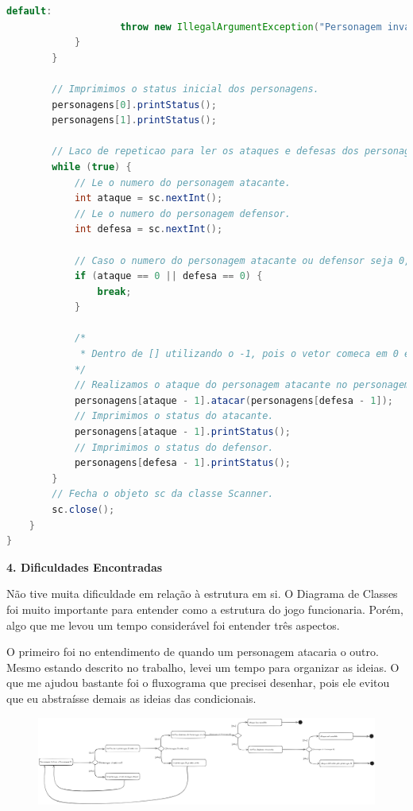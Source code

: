 \documentclass[11pt]{uiobrev}
\begin{document}
\begin{lstlisting}[language=Java, caption={Codigo Principal do Programa}]
                default:
                    throw new IllegalArgumentException("Personagem invalido.");
            }
        }

        // Imprimimos o status inicial dos personagens.
        personagens[0].printStatus();
        personagens[1].printStatus();

        // Laco de repeticao para ler os ataques e defesas dos personagens.
        while (true) {
            // Le o numero do personagem atacante.
            int ataque = sc.nextInt();
            // Le o numero do personagem defensor.
            int defesa = sc.nextInt();

            // Caso o numero do personagem atacante ou defensor seja 0, o laco e interrompido.
            if (ataque == 0 || defesa == 0) {
                break;
            }

            /*
             * Dentro de [] utilizando o -1, pois o vetor comeca em 0 e o numero do personagem comeca em 1. 
            */
            // Realizamos o ataque do personagem atacante no personagem defensor.
            personagens[ataque - 1].atacar(personagens[defesa - 1]);
            // Imprimimos o status do atacante.
            personagens[ataque - 1].printStatus();
            // Imprimimos o status do defensor.
            personagens[defesa - 1].printStatus();
        }
        // Fecha o objeto sc da classe Scanner.
        sc.close();
    }
}
\end{lstlisting}

\vspace{1.5cm}
\Large \textbf{4. Dificuldades Encontradas}

\justifying
Não tive muita dificuldade em relação à estrutura em si. O Diagrama de Classes foi muito importante para entender como a estrutura do jogo funcionaria. Porém, algo que me levou um tempo considerável foi entender três aspectos.

O primeiro foi no entendimento de quando um personagem atacaria o outro. Mesmo estando descrito no trabalho, levei um tempo para organizar as ideias. O que me ajudou bastante foi o fluxograma que precisei desenhar, pois ele evitou que eu abstraísse demais as ideias das condicionais.

\begin{figure}
    \centering
    \includegraphics[width=\textwidth]{ilustracaoLPOO.png}
    \label{fig:exemplo}
\end{figure}
\end{document}
